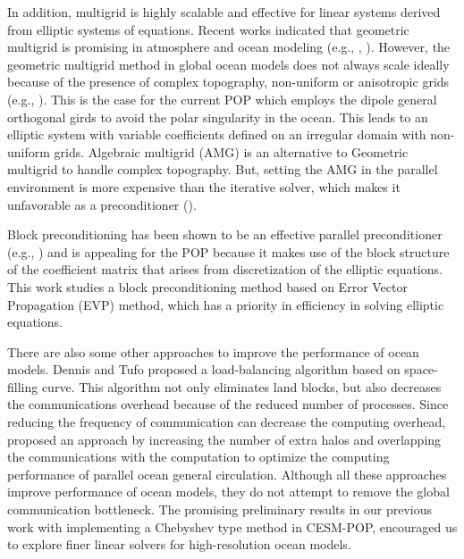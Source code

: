In addition, multigrid is highly scalable and effective for linear systems derived from elliptic systems of equations.
Recent works indicated that  geometric multigrid is promising in atmosphere and ocean modeling (e.g., \cite{muller2014massively}, \cite{matsumura2008non,kanarska2007algorithm}).
However, the geometric multigrid method in global ocean models does not always scale ideally because of the presence of complex topography, non-uniform or anisotropic grids (e.g., \cite{fulton1986multigrid,stuben2001review,tseng2003ghost,matsumura2008non}).
This is the case for the current POP which employs the dipole general orthogonal girds to avoid the polar singularity in the ocean. This leads to an elliptic system with variable coefficients defined on an irregular domain with non-uniform grids.
Algebraic multigrid (AMG) is an alternative to Geometric multigrid to handle complex topography. But, setting the AMG in the parallel environment is more expensive than the iterative solver, which makes it unfavorable as a preconditioner (\cite{muller2014massively}).


Block preconditioning has been shown to be an effective parallel preconditioner (e.g., \cite{concus1985block, white2011block}) and is appealing for the POP because it makes use of the block structure of the coefficient matrix that arises from discretization of the elliptic equations.
This work studies a block preconditioning method based on Error Vector Propagation (EVP) method, which has a priority in efficiency in solving  elliptic equations.

There are also some other approaches to improve the performance of ocean models. Dennis and Tufo proposed a load-balancing algorithm based on space-filling curve\citep{dennis2007inverse, dennis2008scaling}. This algorithm not only eliminates land blocks, but also decreases the communications overhead because of the reduced number of processes. Since reducing the frequency of communication can decrease the computing overhead, \citet{beare1997optimisation} proposed an approach by increasing the number of extra halos and overlapping the communications with the computation to optimize the computing performance of parallel ocean general circulation. Although all these approaches improve performance of ocean models, they do not attempt to remove the global communication bottleneck. The promising preliminary results in our previous work \cite{hu2015improving} with implementing a Chebyshev type method \citep{stiefel1958kernel} in CESM-POP, encouraged us to explore finer linear solvers for high-resolution ocean models.

